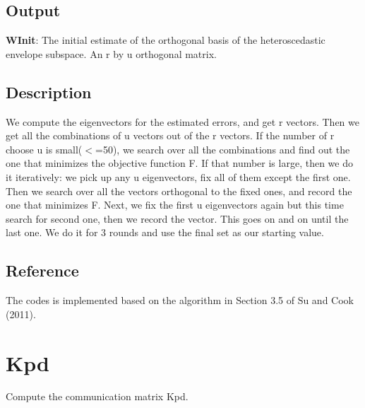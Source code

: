 \documentclass[a4paper,11pt,openany]{memoir}
\begin{document}
\subsection*{Output}

\begin{par}
\textbf{WInit}: The initial estimate of the orthogonal basis of the heteroscedastic envelope subspace. An r by u orthogonal matrix.
\end{par} \vspace{1em}


\subsection*{Description}

\begin{par}
We compute the eigenvectors for the estimated errors, and get r vectors.  Then we get all the combinations of u vectors out of the r vectors. If the number of r choose u is small(\ensuremath{<}=50), we search over all the combinations and find out the one that minimizes the objective function F. If that number is large, then we do it iteratively: we pick up any u eigenvectors, fix all of them except the first one. Then we search over all the vectors orthogonal to the fixed ones, and record the one that minimizes F. Next, we fix the first u eigenvectors again but this time search for second one, then we record the vector. This goes on and on until the last one. We do it for 3 rounds and use the final set as our starting value.
\end{par} \vspace{1em}


\subsection*{Reference}

\begin{par}
The codes is implemented based on the algorithm in Section 3.5 of Su and Cook (2011).
\end{par} \vspace{1em}


\newpage

\rmfamily
\color{black}\section{Kpd}

\begin{par}
Compute the communication matrix Kpd.
\end{par} \vspace{1em}
\end{document}
